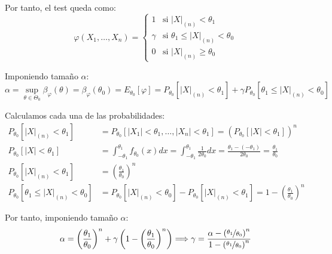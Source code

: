 \begin{ejercicio}
\begin{description}
\begin{description}
            Por tanto, el test queda como:
            \begin{equation*}
                \varphi(X_1, \ldots, X_n) = \left\{\begin{array}{ll}
                    1 & \text{si\ } |X|_{(n)} < \theta_1 \\
                    \gamma & \text{si\ } \theta_1 \leq |X|_{(n)} < \theta_0 \\
                    0 & \text{si\ } |X|_{(n)} \geq \theta_0
                \end{array}\right.
            \end{equation*}

            Imponiendo tamaño $\alpha$:
            \begin{equation*}
                \alpha = \sup_{\theta \in \Theta_0}\beta_\varphi(\theta) = \beta_\varphi(\theta_0) = E_{\theta_0}[\varphi] = P_{\theta_0}[|X|_{(n)} < \theta_1] + \gamma P_{\theta_0}[\theta_1 \leq |X|_{(n)} < \theta_0]
            \end{equation*}

            Calculamos cada una de las probabilidades:
            \begin{align*}
                P_{\theta_0}[|X|_{(n)} < \theta_1] &= P_{\theta_0}[|X_1| < \theta_1, \ldots, |X_n| < \theta_1] = \left(P_{\theta_0}[|X| < \theta_1]\right)^n\\
                P_{\theta_0}[|X| < \theta_1] &= \int_{-\theta_1}^{\theta_1} f_{\theta_0}(x) dx = \int_{-\theta_1}^{\theta_1} \frac{1}{2\theta_0} dx = \frac{\theta_1 - (-\theta_1)}{2\theta_0} = \frac{\theta_1}{\theta_0}\\
                P_{\theta_0}[|X|_{(n)} < \theta_1] &= \left(\frac{\theta_1}{\theta_0}\right)^n\\
                P_{\theta_0}[\theta_1 \leq |X|_{(n)} < \theta_0] &= P_{\theta_0}[|X|_{(n)} < \theta_0] - P_{\theta_0}[|X|_{(n)} < \theta_1] = 1 - \left(\frac{\theta_1}{\theta_0}\right)^n
            \end{align*}

            Por tanto, imponiendo tamaño $\alpha$:
            \begin{equation*}
                \alpha = \left(\frac{\theta_1}{\theta_0}\right)^n + \gamma \left(1 - \left(\frac{\theta_1}{\theta_0}\right)^n\right) \Longrightarrow \gamma = \frac{\alpha - \left(\nicefrac{\theta_1}{\theta_0}\right)^n}{1 - \left(\nicefrac{\theta_1}{\theta_0}\right)^n}
            \end{equation*}


\end{description}
\end{description}
\end{ejercicio}
